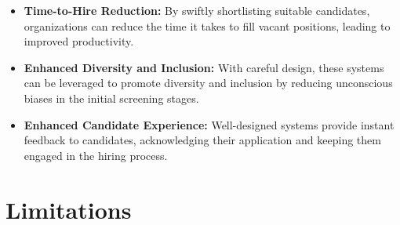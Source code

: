 \begin{itemize}
    \item \textbf{Time-to-Hire Reduction:} By swiftly shortlisting suitable candidates, organizations can reduce the time it takes to fill vacant positions, leading to improved productivity.
    \item \textbf{Enhanced Diversity and Inclusion:} With careful design, these systems can be leveraged to promote diversity and inclusion by reducing unconscious biases in the initial screening stages.
    \item \textbf{Enhanced Candidate Experience:} Well-designed systems provide instant feedback to candidates, acknowledging their application and keeping them engaged in the hiring process.
\end{itemize}

\section{Limitations}
